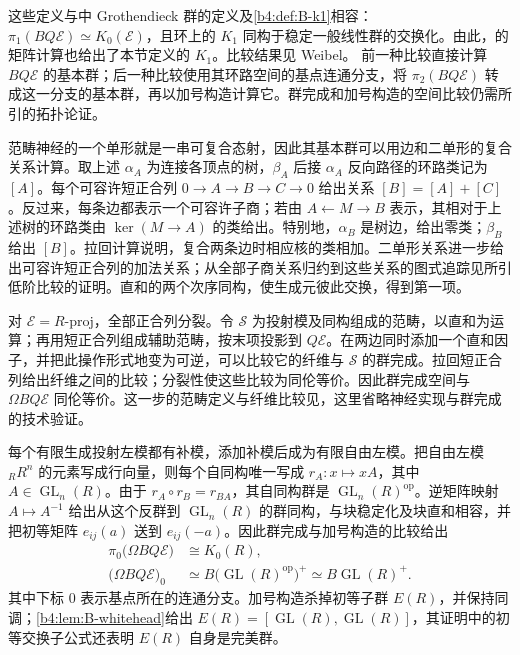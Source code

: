 这些定义与中 Grothendieck 群的定义及\cref{b4:def:B-k1}相容： \(\pi_1(BQ\mathcal E)\simeq K_0(\mathcal E)\)，且环上的 \(K_1\) 同构于稳定一般线性群的交换化。由此，的矩阵计算也给出了本节定义的 \(K_1\)。比较结果见 Weibel\cite[Chapter IV, Proposition 6.2; Section 7]{Weibel2013KBook}。 前一种比较直接计算 \(BQ\mathcal E\) 的基本群；后一种比较使用其环路空间的基点连通分支，将 \(\pi_2(BQ\mathcal E)\) 转成这一分支的基本群，再以加号构造计算它。群完成和加号构造的空间比较仍需所引的拓扑论证。
\begin{proofsketch}
	范畴神经的一个单形就是一串可复合态射，因此其基本群可以用边和二单形的复合关系计算。取上述 \(\alpha_A\) 为连接各顶点的树，\(\beta_A\) 后接 \(\alpha_A\) 反向路径的环路类记为 \([A]\)。每个可容许短正合列 \(0\to A\to B\to C\to0\) 给出关系 \([B]=[A]+[C]\)。反过来，每条边都表示一个可容许子商；若由 \(A\leftarrow M\to B\) 表示，其相对于上述树的环路类由 \(\ker(M\to A)\) 的类给出。特别地，\(\alpha_B\) 是树边，给出零类；\(\beta_B\) 给出 \([B]\)。拉回计算说明，复合两条边时相应核的类相加。二单形关系进一步给出可容许短正合列的加法关系；从全部子商关系归约到这些关系的图式追踪见所引低阶比较的证明。直和的两个次序同构，使生成元彼此交换，得到第一项。

	对 \(\mathcal E=R\text{-}\mathrm{proj}\)，全部正合列分裂。令 \(\mathcal S\) 为投射模及同构组成的范畴，以直和为运算；再用短正合列组成辅助范畴，按末项投影到 \(Q\mathcal E\)。在两边同时添加一个直和因子，并把此操作形式地变为可逆，可以比较它的纤维与 \(\mathcal S\) 的群完成。拉回短正合列给出纤维之间的比较；分裂性使这些比较为同伦等价。因此群完成空间与 \(\Omega BQ\mathcal E\) 同伦等价。这一步的范畴定义与纤维比较见\cite[Chapter IV, Definition 7.3; Example 7.4; Lemma 7.5; Proposition 7.6; Theorem 7.8]{Weibel2013KBook}，这里省略神经实现与群完成的技术验证。

	每个有限生成投射左模都有补模，添加补模后成为有限自由左模。把自由左模 \({}_RR^n\) 的元素写成行向量，则每个自同构唯一写成 \(r_A:x\mapsto xA\)，其中 \(A\in\operatorname{GL}_n(R)\)。由于 \(r_A\circ r_B=r_{BA}\)，其自同构群是 \(\operatorname{GL}_n(R)^{\mathrm{op}}\)。逆矩阵映射 \(A\mapsto A^{-1}\) 给出从这个反群到 \(\operatorname{GL}_n(R)\) 的群同构，与块稳定化及块直和相容，并把初等矩阵 \(e_{ij}(a)\) 送到 \(e_{ij}(-a)\)。因此群完成与加号构造的比较给出
	\[
		\begin{aligned}
			\pi_0\bigl(\Omega BQ\mathcal E\bigr)&\cong K_0(R),\\
			\bigl(\Omega BQ\mathcal E\bigr)_0 &\simeq B\bigl(\operatorname{GL}(R)^{\mathrm{op}}\bigr)^+ \simeq B\operatorname{GL}(R)^+.
		\end{aligned}
	\]
	其中下标 \(0\) 表示基点所在的连通分支。加号构造杀掉初等子群 \(E(R)\)，并保持同调；\cref{b4:lem:B-whitehead}给出 \(E(R)=[\operatorname{GL}(R),\operatorname{GL}(R)]\)，其证明中的初等交换子公式还表明 \(E(R)\) 自身是完美群。


\end{proofsketch}
